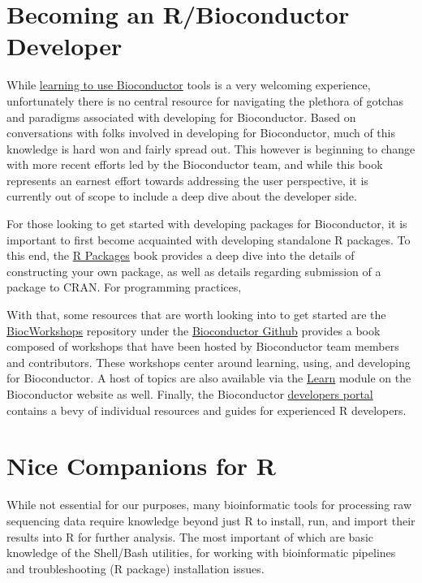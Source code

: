 \documentclass[]{book}
\begin{document}
\hypertarget{becoming-a-bioconductor-developer}{%
\section{Becoming an R/Bioconductor Developer}\label{becoming-a-bioconductor-developer}}

While \protect\hyperlink{bioconductor-documentation}{learning to use Bioconductor} tools is a very welcoming experience, unfortunately there is no central resource for navigating the plethora of gotchas and paradigms associated with developing for Bioconductor. Based on conversations with folks involved in developing for Bioconductor, much of this knowledge is hard won and fairly spread out. This however is beginning to change with more recent efforts led by the Bioconductor team, and while this book represents an earnest effort towards addressing the user perspective, it is currently out of scope to include a deep dive about the developer side.

For those looking to get started with developing packages for Bioconductor, it is important to first become acquainted with developing standalone R packages. To this end, the \href{https://r-pkgs.org/}{R Packages} book provides a deep dive into the details of constructing your own package, as well as details regarding submission of a package to CRAN. For programming practices,

With that, some resources that are worth looking into to get started are the \href{https://github.com/Bioconductor/BiocWorkshops}{BiocWorkshops} repository under the \href{https://github.com/Bioconductor/}{Bioconductor Github} provides a book composed of workshops that have been hosted by Bioconductor team members and contributors. These workshops center around learning, using, and developing for Bioconductor. A host of topics are also available via the \href{http://bioconductor.org/help/course-materials/}{Learn} module on the Bioconductor website as well. Finally, the Bioconductor \href{https://www.bioconductor.org/developers/}{developers portal} contains a bevy of individual resources and guides for experienced R developers.

\hypertarget{nice-companions-for-r}{%
\section{Nice Companions for R}\label{nice-companions-for-r}}

While not essential for our purposes, many bioinformatic tools for processing raw sequencing data require knowledge beyond just R to install, run, and import their results into R for further analysis. The most important of which are basic knowledge of the Shell/Bash utilities, for working with bioinformatic pipelines and troubleshooting (R package) installation issues.
\end{document}
